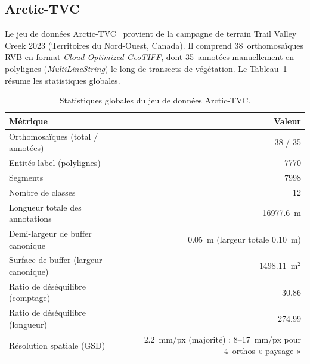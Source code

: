 \documentclass[11pt,a4paper]{article}
\begin{document}
\subsection{Arctic-TVC}

Le jeu de données Arctic-TVC~\autocite{tvc2025} provient de la campagne de terrain Trail Valley Creek 2023 (Territoires du Nord-Ouest, Canada). Il comprend 38~orthomosaïques RVB en format \emph{Cloud Optimized GeoTIFF}, dont 35~annotées manuellement en polylignes (\emph{MultiLineString}) le long de transects de végétation. Le Tableau~\ref{tab:dataset} résume les statistiques globales.

\begin{table}[H]
	\centering
	\caption{Statistiques globales du jeu de données Arctic-TVC.}
	\label{tab:dataset}
	\begin{tabular}{lr}
		\toprule
		\textbf{Métrique}                     & \textbf{Valeur}                                              \\
		\midrule
		Orthomosaïques (total / annotées)     & 38 / 35                                                      \\
		Entités label (polylignes)            & 7770                                                         \\
		Segments                              & 7998                                                         \\
		Nombre de classes                     & 12                                                           \\
		Longueur totale des annotations       & 16977.6~m                                                    \\
		Demi-largeur de buffer canonique      & 0.05~m (largeur totale 0.10~m)                               \\
		Surface de buffer (largeur canonique) & 1498.11~m$^2$                                                \\
		Ratio de déséquilibre (comptage)      & 30.86                                                        \\
		Ratio de déséquilibre (longueur)      & 274.99                                                       \\
		Résolution spatiale (GSD)             & 2.2~mm/px (majorité) ; 8--17~mm/px pour 4~orthos « paysage » \\
		\bottomrule
	\end{tabular}
\end{table}
\end{document}
